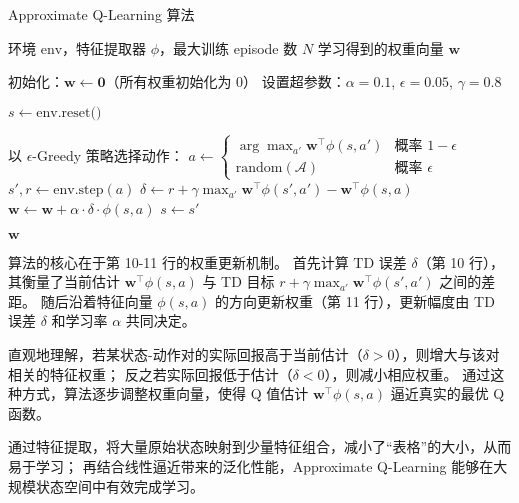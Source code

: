 \begin{algorithm}[h]
    \caption{Approximate Q-Learning 算法}
    \small
    \label{alg:approx_q_learning}
    \begin{algorithmic}[1]
        \Require 环境 $\text{env}$，特征提取器 $\phi$，最大训练 episode 数 $N$
        \Ensure 学习得到的权重向量 $\mathbf{w}$
        
        \State 初始化：$\mathbf{w} \leftarrow \mathbf{0}$（所有权重初始化为 0）
        \State 设置超参数：$\alpha = 0.1$, $\epsilon = 0.05$, $\gamma = 0.8$
        
            \State $s \leftarrow \text{env.reset()}$
            
                \State 以 $\epsilon$-Greedy 策略选择动作：
                \State \quad $a \leftarrow \begin{cases} 
                    \arg\max_{a'} \mathbf{w}^\top \phi(s, a') & \text{概率 } 1-\epsilon \\
                    \text{random}(\mathcal{A}) & \text{概率 } \epsilon
                \end{cases}$
                \State $s', r \leftarrow \text{env.step}(a)$
                \State $\delta \leftarrow r + \gamma \max_{a'} \mathbf{w}^\top \phi(s', a') - \mathbf{w}^\top \phi(s, a)$ 
                \State $\mathbf{w} \leftarrow \mathbf{w} + \alpha \cdot \delta \cdot \phi(s, a)$ 
                \State $s \leftarrow s'$
            \EndWhile
        \EndFor
        
        \Return $\mathbf{w}$
    \end{algorithmic}
\end{algorithm}

算法的核心在于第 10-11 行的权重更新机制。
首先计算 TD 误差 $\delta$（第 10 行），其衡量了当前估计 $\mathbf{w}^\top \phi(s, a)$ 与 TD 目标 $r + \gamma \max_{a'} \mathbf{w}^\top \phi(s', a')$ 之间的差距。
随后沿着特征向量 $\phi(s, a)$ 的方向更新权重（第 11 行），更新幅度由 TD 误差 $\delta$ 和学习率 $\alpha$ 共同决定。

直观地理解，若某状态-动作对的实际回报高于当前估计（$\delta > 0$），则增大与该对相关的特征权重；
反之若实际回报低于估计（$\delta < 0$），则减小相应权重。
通过这种方式，算法逐步调整权重向量，使得 Q 值估计 $\mathbf{w}^\top \phi(s,a)$ 逼近真实的最优 Q 函数。



通过特征提取，将大量原始状态映射到少量特征组合，减小了“表格”的大小，从而易于学习；
再结合线性逼近带来的泛化性能，Approximate Q-Learning 能够在大规模状态空间中有效完成学习。

